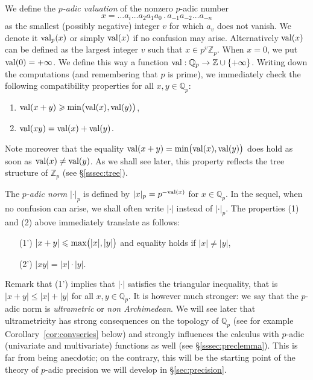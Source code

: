 \documentclass[11pt]{article}
\numberwithin{equation}{section}
\numberwithin{figure}{section}
\renewcommand{\leq}{\leqslant}
\renewcommand{\geq}{\geqslant}
\theoremstyle{definition}
\newcommand{\Z}{\mathbb Z}
\newcommand{\Zp}{\Z_p}
\newcommand{\Q}{\mathbb Q}
\newcommand{\Qp}{\Q_p}
\renewcommand{\min}{\text{\rm min}}
\renewcommand{\max}{\text{\rm max}}
\newcommand{\val}{\text{\rm val}}
\begin{document}
We define the \emph{$p$-adic valuation} of the nonzero $p$-adic 
number 
$$x = \ldots a_i \ldots a_2 a_1 a_0\,.\, a_{-1} a_{-2} \ldots a_{-n}$$
as the smallest (possibly negative) integer $v$ for which $a_v$ 
does not vanish. We denote it $\val_p(x)$ or simply $\val(x)$ if no
confusion may arise. Alternatively $\val(x)$ 
can be defined as the largest integer $v$ such that $x \in p^v \Zp$. 
When $x = 0$, we put $\val(0) = +\infty$.
We define this way a function $\val : \Q_p \to \Z \cup \{+\infty\}$.
Writing down the computations (and remembering that $p$ is prime),
we immediately check the following compatibility properties for all
$x,y \in \Qp$:
\begin{enumerate}[(1)]
\renewcommand{\itemsep}{0pt}
\item $\val(x+y) \geq \min\big(\val(x), \val(y)\big)$,
\item $\val(xy) = \val(x) + \val(y)$.
\end{enumerate}
Note moreover that the equality $\val(x+y) 
= \min\big(\val(x), \val(y)\big)$ does hold as soon as $\val(x)
\neq \val(y)$. As we shall see later, this property reflects the
tree structure of $\Z_p$ (see \S \ref{sssec:tree}).

The \emph{$p$-adic norm} $|\cdot|_p$ is defined by
$|x|_p = p^{-\val(x)}$ for $x \in \Q_p$. In the sequel, when no
confusion can arise, we shall often write $|\cdot|$ instead of
$|\cdot|_p$. The properties (1) and (2) above immediately translate 
as follows:
\begin{enumerate}[(1)]
\renewcommand{\itemsep}{0pt}
\item[(1')] $|x+y| \leq \max\big(|x|, |y|\big)$ and equality holds
if $|x| \neq |y|$,
\item[(2')] $|xy| = |x| \cdot |y|$.
\end{enumerate}
Remark that (1') implies that $|\cdot|$ satisfies the triangular 
inequality, that is $|x+y| \leq |x| + |y|$ for all $x,y \in \Q_p$. 
It is however much stronger: we say that the $p$-adic norm is 
\emph{ultrametric} or \emph{non Archimedean}. We will see later that
ultrametricity has strong consequences on the topology of $\Q_p$ 
(see for example Corollary~\ref{cor:convseries} below) and strongly 
influences the calculus with $p$-adic (univariate and multivariate) 
functions as well (see \S \ref{sssec:preclemma}).
This is far from being anecdotic; on the contrary, this will be the 
starting point of the theory of $p$-adic precision we will
develop in \S \ref{sec:precision}.
\end{document}
